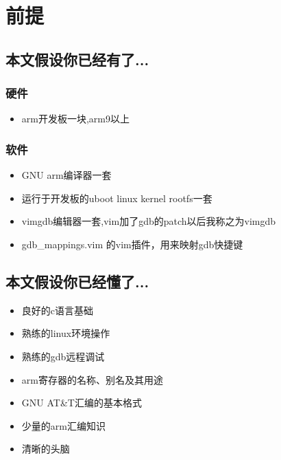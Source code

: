 \chapter{前提}
\section{本文假设你已经有了...}
\subsection{硬件}
\begin{itemize}
    \item arm开发板一块,arm9以上
\end{itemize}
\subsection{软件}
\begin{itemize}
    \item GNU arm编译器一套
    \item 运行于开发板的uboot linux kernel rootfs一套
    \item vimgdb编辑器一套,vim加了gdb的patch以后我称之为vimgdb
    \item gdb\_mappings.vim 的vim插件，用来映射gdb快捷键
\end{itemize}

\section{本文假设你已经懂了...}
\begin{itemize}
    \item 良好的c语言基础
    \item 熟练的linux环境操作
    \item 熟练的gdb远程调试
    \item arm寄存器的名称、别名及其用途
    \item GNU AT\&T汇编的基本格式
    \item 少量的arm汇编知识
    \item 清晰的头脑
\end{itemize}

